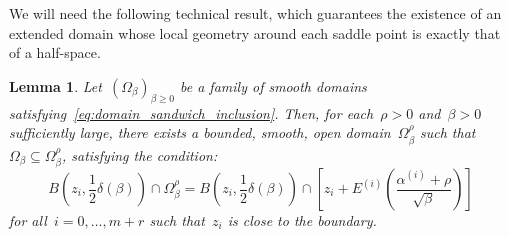 \documentclass[10pt]{article}
\newcommand{\1}{\mathbbm 1}
\newcommand{\largeRadius}{\delta}
\newcommand{\epsLimit}[1]{\alpha^{(#1)}} %
\newcommand{\halfSpace}[1]{E^{(#1)}}
\newcommand{\shift}{\rho} %
\newtheorem{lemma}{Lemma}
\begin{document}
    We will need the following technical result, which guarantees the existence of an extended domain whose local geometry around each saddle point is exactly that of a half-space.
    \begin{lemma}
        \label{lemma:domain_extension}
        Let~$(\Omega_\beta)_{\beta\geq 0}$ be a family of smooth domains satisfying~\eqref{eq:domain_sandwich_inclusion}.
        Then, for each~$\shift>0$ and~$\beta>0$ sufficiently large, there exists a bounded, smooth, open domain~$\Omega_\beta^\shift$ such that~${\Omega_\beta\subseteq \Omega_\beta^\shift}$, satisfying the condition:
        \begin{equation}
            \label{eq:inclusion_perturbed_domain}
           B\left(z_i,\frac12\largeRadius(\beta)\right) \cap \Omega_\beta^\shift = B\left(z_i,\frac12\largeRadius(\beta)\right) \cap \left[z_i + \halfSpace{i}\left(\frac{\epsLimit{i}+\shift}{\sqrt\beta}\right)\right]
        \end{equation}
        for all~$i=0,\dots,m+r$ such that~$z_i$ is close to the boundary.
    \end{lemma}
\end{document}
